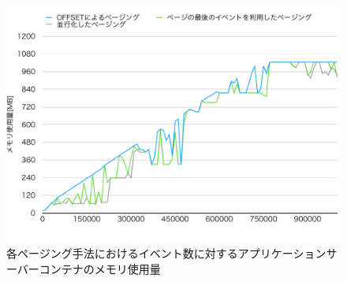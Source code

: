 \documentclass[../../../../../main]{subfiles}
\begin{document}
    \begin{figure}[H]
        \centering
        \includegraphics[width=12cm]{graph}
        \caption{各ページング手法におけるイベント数に対するアプリケーションサーバーコンテナのメモリ使用量}
        \label{fig:each-paging-app-mem-app_1_1024-db_1_1024}
    \end{figure}
\end{document}
